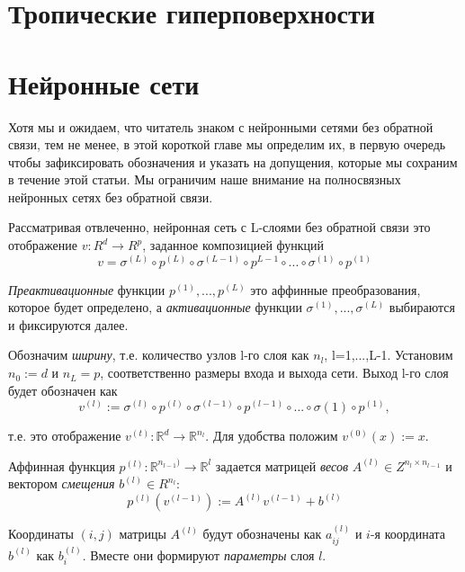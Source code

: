 \documentclass[russian]{lecture-notes}
\begin{document}
	\section{Тропические гиперповерхности}
	
	\section{Нейронные сети}
	
	Хотя мы и ожидаем, что читатель знаком с нейронными сетями без обратной связи, тем не менее, в этой короткой главе мы определим их, в первую очередь чтобы зафиксировать обозначения и указать на допущения, которые мы сохраним в течение этой статьи. Мы ограничим наше внимание на полносвязных нейронных сетях без обратной связи.
	
	Рассматривая отвлеченно, нейронная сеть с L-слоями без обратной связи это отображение $v : R^d \to R^p$, заданное композицией функций
	\begin{equation*}
		v = \sigma^{(L)} \circ p^{(L)} \circ \sigma^{(L-1)} \circ p^{L-1} \circ ... \circ \sigma^{(1)} \circ p^{(1)}
	\end{equation*}
	
	\textit{Преактивационные} функции $p^{(1)},...,p^{(L)}$ это аффинные преобразования, которое будет определено, а \textit{активационные} функции $\sigma^{(1)},...,\sigma^{(L)}$ выбираются и фиксируются далее.
	
	Обозначим \textit{ширину}, т.е. количество узлов l-го слоя как $n_l$, l=1,...,L-1. Установим $n_0 := d$ и $n_L = p$, соответственно размеры входа и выхода сети. Выход l-го слоя будет обозначен как
	\begin{equation*}
		v^{(l)} := \sigma^{(l)} \circ p^{(l)} \circ \sigma^{(l-1)} \circ p^{(l-1)} \circ ... \circ \sigma{(1)} \circ p^{(1)},
	\end{equation*}
	
	т.е. это отображение $v^{(t)} : \mathbb{R}^d \to \mathbb{R}^{n_l}$. Для удобства положим $v^{(0)}(x) := x$.
	
	Аффинная функция $p^{(l)} : \mathbb{R}^{n_{l-1})} \to \mathbb{R}^l$ задается матрицей \textit{весов} $A^{(l)} \in Z^{n_l \times n_{l-1}}$ и вектором \textit{смещения} $b^{(l)} \in R^{n_l}$:
	\begin{equation*}
		p^{(l)}(v^{(l-1)}) := A^{(l)}v^{(l-1)} + b^{(l)}
	\end{equation*}
	
	Координаты $(i, j)$ матрицы $A^{(l)}$ будут обозначены как $a_{ij}^{(l)}$ и $i$-я координата $b^{(l)}$ как $b_{i}^{(l)}$. Вместе они формируют \textit{параметры} слоя $l$.
	
\end{document}
